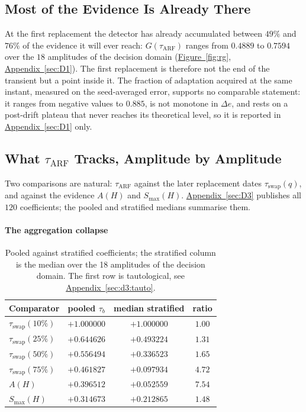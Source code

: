 \documentclass[10pt,conference]{IEEEtran}
\theoremstyle{definition}
\begin{document}
\subsection{Most of the Evidence Is Already There}
\label{sec:gshare}

At the first replacement the detector has already accumulated between $49\%$ and $76\%$ of
the evidence it will ever reach: $G(\tau_{\mathrm{ARF}})$ ranges from $0.4889$ to $0.7594$
over the $18$ amplitudes of the decision domain (\hyperref[fig:rg]{Figure~\ref*{fig:rg}}, \hyperref[sec:D1]{Appendix~\ref*{sec:D1}}). The first replacement
is therefore not the end of the transient but a point inside it. The fraction of
adaptation acquired at the same instant, measured on the seed-averaged error, supports no
comparable statement: it ranges from negative values to $0.885$, is not monotone in
$\Delta e$, and rests on a post-drift plateau that never reaches its theoretical level, so
it is reported in \hyperref[sec:D1]{Appendix~\ref*{sec:D1}} only.

\subsection{What $\tau_{\mathrm{ARF}}$ Tracks, Amplitude by Amplitude}
\label{sec:tracks}

Two comparisons are natural: $\tau_{\mathrm{ARF}}$ against the later replacement
dates $\tau_{\mathrm{swap}}(q)$, and against the evidence $A(H)$ and $S_{\max}(H)$.
\hyperref[sec:D3]{Appendix~\ref*{sec:D3}} publishes all $120$ coefficients; the pooled and stratified medians
summarise them.

\paragraph{The aggregation collapse}

\begin{table}[t]
  \centering
\caption{Pooled against stratified coefficients; the stratified column is the median
  over the 18 amplitudes of the decision domain. The first row is tautological, see
  \hyperref[sec:d3:tauto]{Appendix~\ref*{sec:d3:tauto}}.}
\label{tab:agregation}
  \small
  \begin{tabular}{lccc}
    \toprule
    Comparator & pooled $\tau_b$ & median stratified & ratio \\
    \midrule
    $\tau_{\mathrm{swap}}(10\%)$ & $+1.000000$ & $+1.000000$ & $1.00$ \\
    $\tau_{\mathrm{swap}}(25\%)$ & $+0.644626$ & $+0.493224$ & $1.31$ \\
    $\tau_{\mathrm{swap}}(50\%)$ & $+0.556494$ & $+0.336523$ & $1.65$ \\
    $\tau_{\mathrm{swap}}(75\%)$ & $+0.461827$ & $+0.097934$ & $4.72$ \\
    $A(H)$                       & $+0.396512$ & $+0.052559$ & $7.54$ \\
    $S_{\max}(H)$                & $+0.314673$ & $+0.212865$ & $1.48$ \\
    \bottomrule
  \end{tabular}

\end{table}
\end{document}
